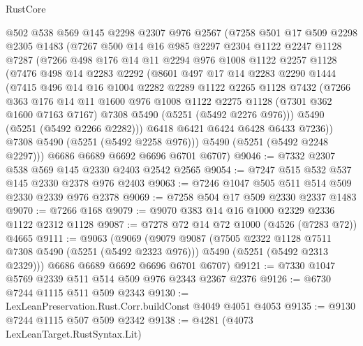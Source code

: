 \begin{lexlean}{RustCore}
\begin{coremodule}
    @502
    @538
    @569
    @145
    @2298
    @2307
    @976
    @2567
    (@7258
      @501
      @17
      @509
      @2298
      @2305
      @1483
      (@7267
        @500
        @14
        @16
        @985
        @2297
        @2304
        @1122
        @2247
        @1128
        @7287
        (@7266
          @498
          @176
          @14
          @11
          @2294
          @976
          @1008
          @1122
          @2257
          @1128
          (@7476
            @498
            @14
            @2283
            @2292
            (@8601
              @497
              @17
              @14
              @2283
              @2290
              @1444
              (@7415
                @496
                @14
                @16
                @1004
                @2282
                @2289
                @1122
                @2265
                @1128
                @7432
                (@7266
                  @363
                  @176
                  @14
                  @11
                  @1600
                  @976
                  @1008
                  @1122
                  @2275
                  @1128
                  (@7301 @362 @1600 @7163 @7167)
                  @7308
                  @5490
                  (@5251 (@5492 @2276 @976)))
                @5490
                (@5251 (@5492 @2266 @2282)))
              @6418
              @6421
              @6424
              @6428
              @6433
              @7236))
          @7308
          @5490
          (@5251 (@5492 @2258 @976)))
        @5490
        (@5251 (@5492 @2248 @2297)))
      @6686
      @6689
      @6692
      @6696
      @6701
      @6707)
@9046 := @7332 @2307 @538 @569 @145 @2330 @2403 @2542 @2565
@9054 := @7247 @515 @532 @537 @145 @2330 @2378 @976 @2403
@9063 := @7246 @1047 @505 @511 @514 @509 @2330 @2339 @976 @2378
@9069 := @7258 @504 @17 @509 @2330 @2337 @1483
@9070 := @7266 @168
@9079 := @9070 @383 @14 @16 @1000 @2329 @2336 @1122 @2312 @1128
@9087 := @7278 @72 @14 @72 @1000 (@4526 (@7283 @72)) @4665
@9111 := @9063
    (@9069
      (@9079
        @9087
        (@7505 @2322 @1128 @7511 @7308 @5490 (@5251 (@5492 @2323 @976)))
        @5490
        (@5251 (@5492 @2313 @2329)))
      @6686
      @6689
      @6692
      @6696
      @6701
      @6707)
@9121 := @7330 @1047 @5769 @2339 @511 @514 @509 @976 @2343 @2367 @2376
@9126 := @6730 @7244 @1115 @511 @509 @2343
@9130 := LexLeanPreservation.Rust.Corr.buildConst @4049 @4051 @4053
@9135 := @9130 @7244 @1115 @507 @509 @2342
@9138 := @4281 (@4073 LexLeanTarget.RustSyntax.Lit)

\end{coremodule}
\end{lexlean}
